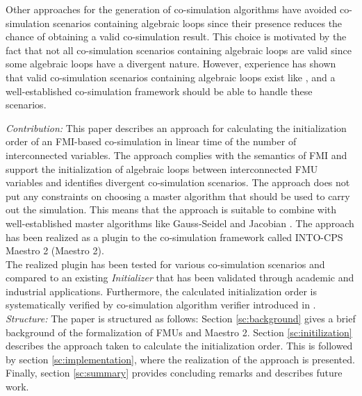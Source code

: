 \noindent Other approaches for the generation of co-simulation algorithms have avoided co-simulation scenarios containing algebraic loops since their presence reduces the chance of obtaining a valid co-simulation result\cite{Amalio2016CheckingCo-simulation, BromanCompositionCo-Simulation}. This choice is motivated by the fact that not all co-simulation scenarios containing algebraic loops are valid since some algebraic loops have a divergent nature. However, experience has shown that valid co-simulation scenarios containing algebraic loops exist like , and a well-established co-simulation framework should be able to handle these scenarios. 

\textit{Contribution:} This paper describes an approach for calculating the initialization order of an FMI-based co-simulation in linear time of the number of interconnected variables. The approach complies with the semantics of FMI and support the initialization of algebraic loops between interconnected FMU variables and identifies divergent co-simulation scenarios. The approach does not put any constraints on choosing a master algorithm that should be used to carry out the simulation. This means that the approach is suitable to combine with well-established master algorithms like Gauss-Seidel and Jacobian \cite{Palensky2017}. The approach has been realized as a plugin to the co-simulation framework called INTO-CPS Maestro 2 (Maestro 2). \\
The realized plugin has been tested for various co-simulation scenarios and compared to an existing \textit{Initializer} that has been validated through academic and industrial applications. 
Furthermore, the calculated initialization order is systematically verified by co-simulation algorithm verifier introduced in \cite{gomes_lucio_vangheluwe_2019}. \\

\textit{Structure:} The paper is structured as follows: Section \ref{sc:background} gives a brief background of the formalization of FMUs and Maestro 2. Section \ref{sc:initilization} describes the approach taken to calculate the initialization order. This is followed by section \ref{sc:implementation}, where the realization of the approach is presented. Finally, section \ref{sc:summary} provides concluding remarks and describes future work.